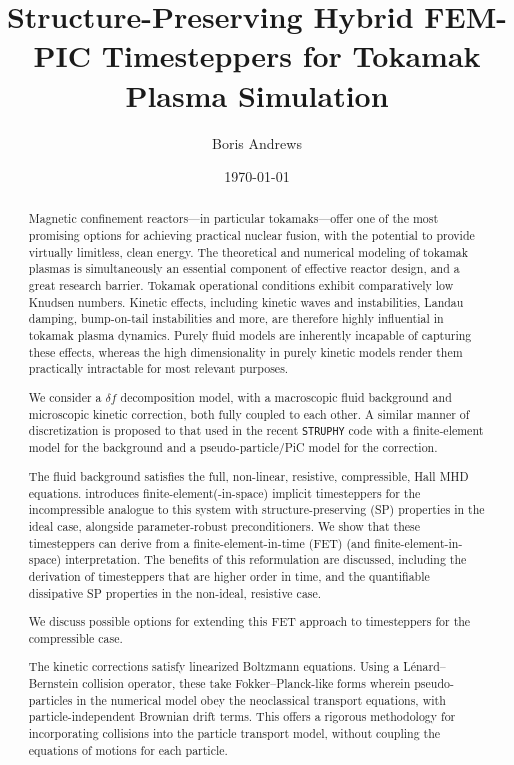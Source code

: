 \documentclass[12pt, a4paper]{report}
\title{Structure-Preserving Hybrid FEM-PIC Timesteppers for Tokamak Plasma Simulation}
\author{Boris Andrews}
\affil{Mathematical Institute, University of Oxford}
\date{\today}
\begin{document}
    \maketitle
    
    
    \begin{abstract}
        Magnetic confinement reactors---in particular tokamaks---offer one of the most promising options for achieving practical nuclear fusion, with the potential to provide virtually limitless, clean energy. The theoretical and numerical modeling of tokamak plasmas is simultaneously an essential component of effective reactor design, and a great research barrier. Tokamak operational conditions exhibit comparatively low Knudsen numbers. Kinetic effects, including kinetic waves and instabilities, Landau damping, bump-on-tail instabilities and more, are therefore highly influential in tokamak plasma dynamics. Purely fluid models are inherently incapable of capturing these effects, whereas the high dimensionality in purely kinetic models render them practically intractable for most relevant purposes.

        We consider a $\delta\!f$ decomposition model, with a macroscopic fluid background and microscopic kinetic correction, both fully coupled to each other. A similar manner of discretization is proposed to that used in the recent {\tt STRUPHY} code \cite{Holderied_Possanner_Wang_2021, Holderied_2022, Li_et_al_2023} with a finite-element model for the background and a pseudo-particle/PiC model for the correction.

        The fluid background satisfies the full, non-linear, resistive, compressible, Hall MHD equations. \cite{Laakmann_Hu_Farrell_2022} introduces finite-element(-in-space) implicit timesteppers for the incompressible analogue to this system with structure-preserving (SP) properties in the ideal case, alongside parameter-robust preconditioners. We show that these timesteppers can derive from a finite-element-in-time (FET) (and finite-element-in-space) interpretation. The benefits of this reformulation are discussed, including the derivation of timesteppers that are higher order in time, and the quantifiable dissipative SP properties in the non-ideal, resistive case.
        
        We discuss possible options for extending this FET approach to timesteppers for the compressible case.

        The kinetic corrections satisfy linearized Boltzmann equations. Using a Lénard--Bernstein collision operator, these take Fokker--Planck-like forms \cite{Fokker_1914, Planck_1917} wherein pseudo-particles in the numerical model obey the neoclassical transport equations, with particle-independent Brownian drift terms. This offers a rigorous methodology for incorporating collisions into the particle transport model, without coupling the equations of motions for each particle.
        

\end{abstract}
\end{document}
